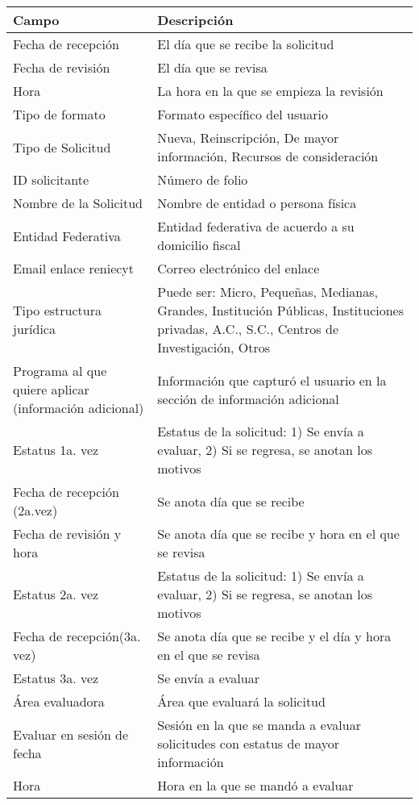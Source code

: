 \begin{tabular}{ m{} m{}  }%
	\rowcolor{gray1} {\bf Campo} &  {\bf Descripción} \\ \hline \hline

	Fecha de recepción &El día que se recibe la solicitud\\
	\rowcolor{gray1} Fecha de revisión &El día que se revisa\\
	Hora& La hora en la que se empieza la revisión\\
	\rowcolor{gray1} Tipo de formato &Formato específico del usuario \\
	Tipo de Solicitud&Nueva, Reinscripción, De mayor información, Recursos de consideración \\
	\rowcolor{gray1} ID solicitante& Número de folio \\
	Nombre de la Solicitud & Nombre de entidad o persona física\\
	\rowcolor{gray1} Entidad Federativa& Entidad federativa de acuerdo a su domicilio fiscal\\
	Email enlace reniecyt& Correo electrónico del enlace \\
	\rowcolor{gray1}Tipo estructura jurídica& Puede ser: Micro, Pequeñas, Medianas, Grandes, Institución Públicas, Instituciones privadas, A.C., S.C., Centros de Investigación, Otros \\
	Programa al que quiere aplicar (información adicional)&Información que capturó el usuario en la sección de información adicional  \\
	\rowcolor{gray1} Estatus 1a. vez& Estatus de la solicitud: 1) Se envía a  evaluar, 2) Si se regresa, se anotan los motivos \\
	Fecha de recepción (2a.vez) & Se anota día que se recibe \\
	\rowcolor{gray1} Fecha de revisión y hora& Se anota día que se recibe y hora en el que se revisa \\
	Estatus 2a. vez& Estatus de la solicitud: 1) Se envía a  evaluar, 2) Si se regresa, se anotan los motivos\\
	\rowcolor{gray1} Fecha de recepción(3a. vez) & Se anota día que se recibe y el día y hora en el que se revisa\\
	Estatus 3a. vez& Se envía a evaluar\\
	\rowcolor{gray1} Área evaluadora& Área que evaluará la solicitud \\
	Evaluar en sesión de fecha &Sesión en la que se manda a evaluar solicitudes con estatus de mayor información \\
	\rowcolor{gray1} Hora&Hora en la que se mandó a evaluar \\
\end{tabular}


